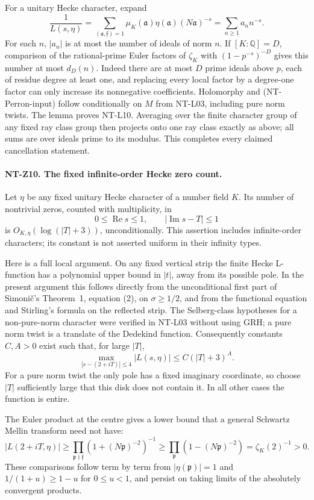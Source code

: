 \documentclass[11pt,a4paper]{article}
\begin{document}
For a unitary Hecke character, expand
\[
 \frac1{L(s,\eta)}
 =\sum_{(\mathfrak a,\mathfrak f)=1}
         \mu_K(\mathfrak a)\eta(\mathfrak a)(N\mathfrak a)^{-s}
 =\sum_{n\ge1}a_nn^{-s}.
\]
For each $n$, $|a_n|$ is at most the number of ideals of norm $n$.
If $[K:\mathbb Q]=D$, comparison of the rational-prime Euler factors
of $\zeta_K$ with $(1-p^{-s})^{-D}$ gives this number at most $d_D(n)$.
Indeed there are at most $D$ prime ideals above $p$, each of residue
degree at least one, and replacing every local factor by a degree-one
factor can only increase its nonnegative coefficients.  Holomorphy and
(NT-Perron-input) follow conditionally on $M$ from NT-L03, including
pure norm twists.  The lemma proves NT-L10.  Averaging over the finite
character group of any fixed ray class group then projects onto one ray
class exactly as above; all sums are over ideals prime to its modulus.
This completes every claimed cancellation statement.

\paragraph{NT-Z10. The fixed infinite-order Hecke zero count.}
Let $\eta$ be any fixed unitary Hecke character of a number field $K$.
Its number of nontrivial zeros, counted with multiplicity, in
\[
 0\le\operatorname{Re}s\le1,\qquad |\operatorname{Im}s-T|\le1
\]
is $O_{K,\eta}(\log(|T|+3))$, unconditionally.  This assertion includes
infinite-order characters; its constant is not asserted uniform in
their infinity types.

Here is a full local argument.  On any fixed vertical strip the finite
Hecke L-function has a polynomial upper bound in $|t|$, away from its
possible pole.  In the present argument this follows directly from the
unconditional first part of Simoni\v c's Theorem~1, equation (2), on
$\sigma\ge1/2$, and from the functional equation and Stirling's formula
on the reflected strip.  The Selberg-class hypotheses for a non-pure-norm
character were verified in NT-L03 without using GRH; a pure norm twist
is a translate of the Dedekind function.  Consequently constants $C,A>0$
exist such that, for large $|T|$,
\[
 \max_{|s-(2+iT)|\le4}|L(s,\eta)|\le C(|T|+3)^A.
\tag{NT-J-upper}
\]
For a pure norm twist the only pole has a fixed imaginary coordinate, so
choose $|T|$ sufficiently large that this disk does not contain it.
In all other cases the function is entire.

The Euler product at the centre gives a lower bound that a general
Schwartz Mellin transform need not have:
\[
 |L(2+iT,\eta)|
 \ge\prod_{\mathfrak p\nmid\mathfrak f}(1+(N\mathfrak p)^{-2})^{-1}
 \ge\prod_{\mathfrak p}(1-(N\mathfrak p)^{-2})
 =\zeta_K(2)^{-1}>0.
\tag{NT-J-lower}
\]
These comparisons follow term by term from $|\eta(\mathfrak p)|=1$
and $1/(1+u)\ge1-u$ for $0\le u<1$, and persist on taking limits of
the absolutely convergent products.
\end{document}
